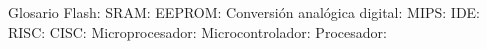 

Glosario
Flash:
SRAM:
EEPROM:
Conversión analógica digital:
MIPS:
IDE:
RISC:
CISC:
Microprocesador:
Microcontrolador:
Procesador:

